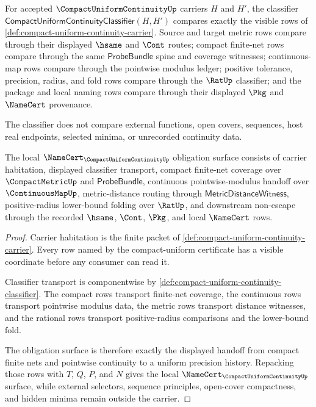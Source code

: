 \begin{definition}
\label{def:compact-uniform-continuity-classifier}
For accepted $\CompactUniformContinuityUp$ carriers $H$ and $H'$, the classifier $\mathsf{CompactUniformContinuityClassifier}(H,H')$ compares exactly the visible rows of \autoref{def:compact-uniform-continuity-carrier}. Source and target metric rows compare through their displayed $\hsame$ and $\Cont$ routes; compact finite-net rows compare through the same $\mathsf{ProbeBundle}$ spine and coverage witnesses; continuous-map rows compare through the pointwise modulus ledger; positive tolerance, precision, radius, and fold rows compare through the $\RatUp$ classifier; and the package and local naming rows compare through their displayed $\Pkg$ and $\NameCert$ provenance.

The classifier does not compare external functions, open covers, sequences, host real endpoints, selected minima, or unrecorded continuity data.
\end{definition}

\begin{theorem}
\label{thm:compact-uniform-continuity-namecert-obligations}
The local $\NameCert_{\CompactUniformContinuityUp}$ obligation surface consists of carrier habitation, displayed classifier transport, compact finite-net coverage over $\CompactMetricUp$ and $\mathsf{ProbeBundle}$, continuous pointwise-modulus handoff over $\ContinuousMapUp$, metric-distance routing through $\mathsf{MetricDistanceWitness}$, positive-radius lower-bound folding over $\RatUp$, and downstream non-escape through the recorded $\hsame$, $\Cont$, $\Pkg$, and local $\NameCert$ rows.
\end{theorem}
\begin{proof}
Carrier habitation is the finite packet of \autoref{def:compact-uniform-continuity-carrier}. Every row named by the compact-uniform certificate has a visible coordinate before any consumer can read it.

Classifier transport is componentwise by \autoref{def:compact-uniform-continuity-classifier}. The compact rows transport finite-net coverage, the continuous rows transport pointwise modulus data, the metric rows transport distance witnesses, and the rational rows transport positive-radius comparisons and the lower-bound fold.

The obligation surface is therefore exactly the displayed handoff from compact finite nets and pointwise continuity to a uniform precision history. Repacking those rows with $T$, $Q$, $P$, and $N$ gives the local $\NameCert_{\CompactUniformContinuityUp}$ surface, while external selectors, sequence principles, open-cover compactness, and hidden minima remain outside the carrier.
\end{proof}

